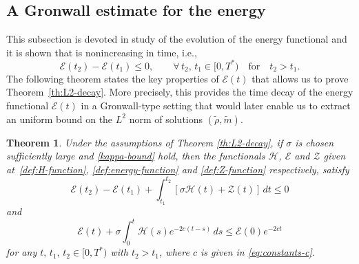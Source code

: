 \documentclass[10pt,reqno]{amsart}
\newtheorem{theorem}{Theorem}[section]
\begin{document}
\subsection{A Gronwall estimate for the energy}\label{S3.2}
This subsection is devoted in study of the evolution of the energy functional and it is shown that is nonincreasing in time, i.e., 
\begin{equation*}
    \mathcal{E}(t_2)-\mathcal{E}(t_1)\leq 0,\qquad \forall\, t_2,\,t_1\in[0,T^*)\quad\text{for}\quad t_2>t_1.
\end{equation*}
The following theorem states the key properties of $\mathcal{E}(t)$ that allows us to prove Theorem~\ref{th:L2-decay}. More precisely, this provides the time decay of the energy functional $\mathcal{E}(t)$ in a Gronwall-type setting that would later enable us to extract an uniform bound on the $L^2$ norm of solutions $(\tilde\rho,\tilde m)$. 

\begin{theorem}\label{th:energy-estimates}
    Under the assumptions of Theorem \ref{th:L2-decay}, %
if $\sigma$ is chosen sufficiently large and \eqref{kappa-bound} hold,
   then the functionals $\mathcal H$, $\mathcal E$ and $\mathcal Z$ given at~\eqref{def:H-function}, \eqref{def:energy-function} and \eqref{def:Z-function} respectively, satisfy
    \begin{equation}\label{eq:inequality-EHZ1}
        \mathcal E(t_2)-\mathcal E(t_1) + \int_{t_1}^{t_2} \left[\sigma \mathcal H(t) +  \mathcal Z(t) \right]\,dt \leq 0
    \end{equation}
and  
    \begin{equation}\label{eq:gronw-energy}
        \mathcal{E}(t) + \sigma\int_0^t \mathcal H(s)e^{-2c(t-s)}\,ds \leq \mathcal E(0)e^{-2ct}
    \end{equation}
for any $t,\,t_1,\,t_2\in[0, T^*)$ with $t_2>t_1$, where $c$ is given in \eqref{eq:constants-c}. 
\end{theorem}
\end{document}
